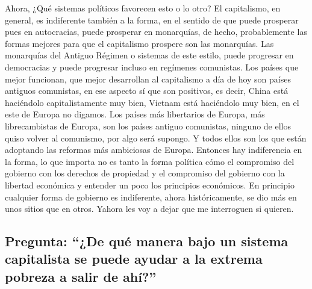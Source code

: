 Ahora, ¿Qué sistemas políticos favorecen esto o lo otro? El capitalismo, en general, es indiferente también a la forma, en el sentido de que puede prosperar pues en autocracias, puede prosperar en monarquías, de hecho, probablemente las formas mejores para que el capitalismo prospere son las monarquías. Las monarquías del Antiguo Régimen o sistemas de este estilo, puede progresar en democracias y puede progresar incluso en regímenes comunistas. Los países que mejor funcionan, que mejor desarrollan al capitalismo a día de hoy son países antiguos comunistas, en ese aspecto sí que son positivos, es decir, China está haciéndolo capitalistamente muy bien, Vietnam está haciéndolo muy bien,
en el este de Europa no digamos. Los países más libertarios de Europa, más librecambistas de Europa, son los países antiguo comunistas, ninguno de ellos quiso volver al comunismo, por algo será supongo. Y todos ellos son los que están adoptando las reformas más ambiciosas de Europa. Entonces hay indiferencia en la forma, lo que importa no es tanto la forma política cómo el compromiso del gobierno con los derechos de propiedad y el compromiso del gobierno con la libertad económica y entender un poco los principios económicos. En principio cualquier forma de gobierno es indiferente, ahora históricamente, se dio más en unos sitios que en otros. Yahora les voy a dejar que me interroguen si quieren.

\subsection{Pregunta: \enquote{¿De qué manera bajo un sistema capitalista se puede ayudar a la extrema pobreza a salir de ahí?}}

